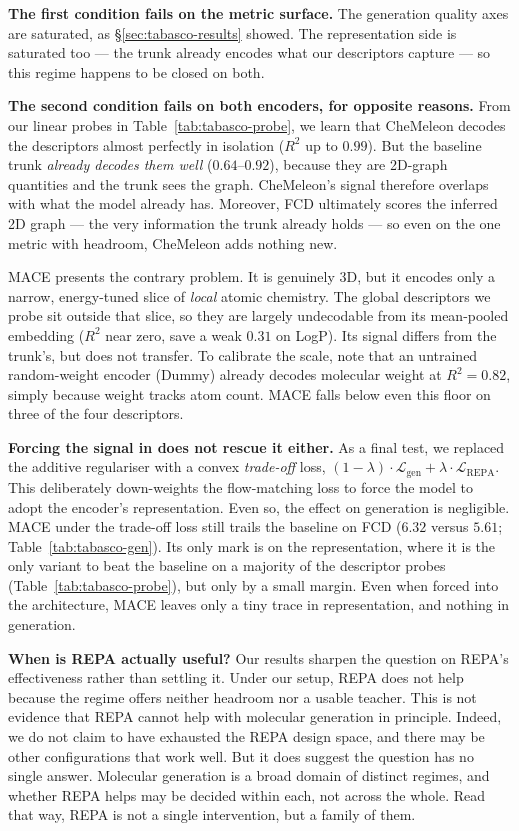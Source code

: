 \documentclass[12pt,a4paper,twoside]{report}
\begin{document}
\textbf{The first condition fails on the metric surface.} The generation quality axes are saturated, as \S\ref{sec:tabasco-results} showed. The representation side is saturated too --- the trunk already encodes what our descriptors capture --- so this regime happens to be closed on both.

\textbf{The second condition fails on both encoders, for opposite reasons.} From our linear probes in Table~\ref{tab:tabasco-probe}, we learn that CheMeleon decodes the descriptors almost perfectly in isolation ($R^2$ up to $0.99$). But the baseline trunk \emph{already decodes them well} ($0.64$--$0.92$), because they are 2D-graph quantities and the trunk sees the graph. CheMeleon's signal therefore overlaps with what the model already has. Moreover, FCD ultimately scores the inferred 2D graph --- the very information the trunk already holds --- so even on the one metric with headroom, CheMeleon adds nothing new.

MACE presents the contrary problem. It is genuinely 3D, but it encodes only a narrow, energy-tuned slice of \emph{local} atomic chemistry. The global descriptors we probe sit outside that slice, so they are largely undecodable from its mean-pooled embedding ($R^2$ near zero, save a weak $0.31$ on LogP). Its signal differs from the trunk's, but does not transfer. To calibrate the scale, note that an untrained random-weight encoder (Dummy) already decodes molecular weight at $R^2 = 0.82$, simply because weight tracks atom count. MACE falls below even this floor on three of the four descriptors.



\textbf{Forcing the signal in does not rescue it either.} As a final test, we replaced the additive regulariser with a convex \emph{trade-off} loss, $(1-\lambda)\cdot\mathcal{L}_{\text{gen}} + \lambda\cdot\mathcal{L}_{\text{REPA}}$. This deliberately down-weights the flow-matching loss to force the model to adopt the encoder's representation. Even so, the effect on generation is negligible. MACE under the trade-off loss still trails the baseline on FCD ($6.32$ versus $5.61$; Table~\ref{tab:tabasco-gen}). Its only mark is on the representation, where it is the only variant to beat the baseline on a majority of the descriptor probes (Table~\ref{tab:tabasco-probe}), but only by a small margin. Even when forced into the architecture, MACE leaves only a tiny trace in representation, and nothing in generation.

\textbf{When is REPA actually useful?} Our results sharpen the question on REPA's effectiveness rather than settling it. Under our setup, REPA does not help because the regime offers neither headroom nor a usable teacher. This is not evidence that REPA cannot help with molecular generation in principle. Indeed, we do not claim to have exhausted the REPA design space, and there may be other configurations that work well. But it does suggest the question has no single answer. Molecular generation is a broad domain of distinct regimes, and whether REPA helps may be decided within each, not across the whole. Read that way, REPA is not a single intervention, but a family of them.
\end{document}
